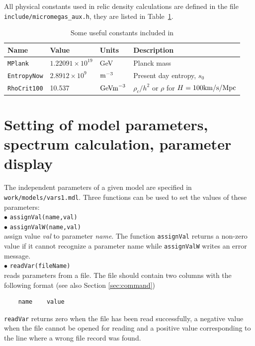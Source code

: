 \documentclass[12pt,a4paper]{article}
\begin{document}
All physical constants used in relic density calculations are defined  in the  file \\
\verb|include/micromegas_aux.h|,  they   are listed in Table~\ref{tab:constants}.

\begin{table}[ht!]\centering
\caption{Some useful constants included in \micro}
\label{tab:constants}
\begin{tabular}{| llll |}
\hline
Name & Value & Units & Description\\\hline
\verb|MPlank| &     $1.22091\times 10^{19}$  &  GeV & Planck mass    \\
\verb|EntropyNow| &  $2.8912\times 10^{9}$    & ${\rm m}^{-3}$ & Present day entropy, $s_0$     \\
\verb|RhoCrit100| & 10.537     & ${\rm GeV m}^{-3}$  & $\rho_c/h^2$  or $\rho$ for $H=100 {\rm km/s/Mpc}$ \\\hline
\end{tabular}\vspace*{3mm}
\end{table}



\section{Setting of model parameters, spectrum calculation, parameter display}
\label{setting_parameters}
The independent parameters %
of a given model are specified in 
\noindent
\verb|work/models/vars1.mdl|. Three functions can be used to set the
values of these parameters:\\[2mm]
$\bullet$ \verb|assignVal(name,val)|\\[2mm]
$\bullet$ \verb|assignValW(name,val)|\\[2mm]
assign value {\it val} to parameter {\it name}. The function  \verb|assignVal| returns a non-zero
value  if it
cannot recognize  a parameter name while \verb|assignValW| writes an error message.\\[2mm]
$\bullet$ \verb|readVar(fileName)|\\
reads parameters from a file. The file  should contain two columns with the 
 following  format (see also Section \ref{sec:command})
\begin{verbatim}
    name    value
\end{verbatim}
\verb|readVar| returns zero when
the file has been read successfully, a negative value when the
file cannot be opened for reading and  a positive  value 
corresponding to the line where a wrong file record was found.
\end{document}
